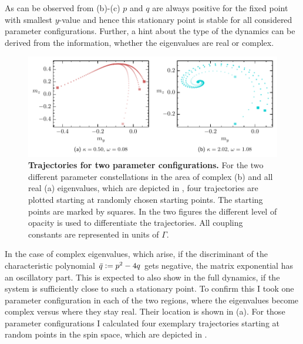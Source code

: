 As can be observed from  (b)-(c) $p$ and $q$ are always positive for the fixed point with smallest $y$-value and hence this stationary point is stable for all considered parameter configurations. Further, a hint about the type of the dynamics can be derived from the information, whether the eigenvalues are real or complex. 
\begin{figure}[H]
    \centering
    \includegraphics{pictures/example_traj_d0.pdf}
    \caption{\textbf{Trajectories for two parameter configurations.} For the two different parameter constellations in the area of complex (b) and all real (a) eigenvalues, which are depicted in , four trajectories are plotted starting at randomly chosen starting points. The starting points are marked by squares. In the two figures the different level of opacity is used to differentiate the trajectories. All coupling constants are represented in units of $\Gamma$.
    }
    \label{fig:expl_traj_d0}
\end{figure}
In the case of complex eigenvalues, which arise, if the discriminant of the characteristic polynomial $\bar{q}\vcentcolon=p^2-4q$ gets negative,  the matrix exponential has an oscillatory part. This is expected to also show in the full dynamics, if the system is sufficiently close to such a stationary point. To confirm this I took one parameter configuration in each of the two regions, where the eigenvalues become complex versus where they stay real. Their location is shown in  (a). For those parameter configurations I calculated four exemplary trajectories starting at random points in the spin space, which are depicted in .

